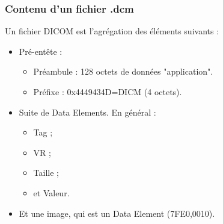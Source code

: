 \frame
{
	\frametitle{Contenu d'un fichier .dcm}
	
	Un fichier DICOM est l'agr\'egation des \'el\'ements suivants :
	\begin{itemize}
		\item Pr\'e-ent\^ete :
		\begin{itemize}
			\item Pr\'eambule : 128 octets de donn\'ees "application".
			\item Pr\'efixe : 0x4449434D=DICM (4 octets).
		\end{itemize}
		\item Suite de Data Elements.
		En g\'en\'eral :
		\begin{itemize}
			\item Tag ;
			\item VR ;
			\item Taille ;
			\item et Valeur.
		\end{itemize}
		\item Et une image, qui est un Data Element (7FE0,0010).
	\end{itemize}
}


